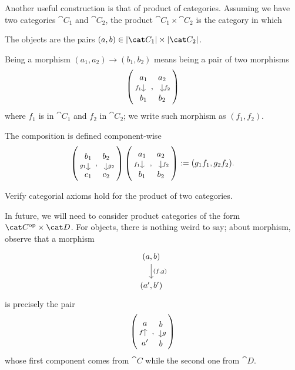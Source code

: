 Another useful construction is that of product of categories. Assuming
we have two categories \(\cat C_1\) and \(\cat C_2\), the product
\(\cat C_1 \times \cat C_2\) is the category in which
\begin{tcbitem}
\item The objects are the pairs
  \((a, b) \in \obj{\cat C_1} \times \obj{\cat C_2}\).
\item Being a morphism \((a_1, a_2) \to (b_1, b_2)\) means being a
  pair of two morphisms
  \[\left(\begin{tikzcd}[row sep=small] a_1 \ar["{f_1}", d, swap] \\
        b_1 \end{tikzcd}, \begin{tikzcd}[row sep=small] a_2
        \ar["{f_2}", d] \\ b_2 \end{tikzcd}\right)\] where \(f_1\) is
  in \(\cat C_1\) and \(f_2\) in \(\cat C_2\); we write such morphism
  as \(\left(f_1, f_2\right)\).
\item The composition is defined component-wise
  \[\left(\begin{tikzcd}[row sep=small] b_1 \ar["{g_1}", d, swap] \\
        c_1 \end{tikzcd}, \begin{tikzcd}[row sep=small] b_2
        \ar["{g_2}", d] \\ c_2 \end{tikzcd}\right)
    \left(\begin{tikzcd}[row sep=small] a_1 \ar["{f_1}", d, swap] \\
        b_1 \end{tikzcd}, \begin{tikzcd}[row sep=small] a_2
        \ar["{f_2}", d] \\ b_2 \end{tikzcd}\right) := (g_1 f_1, g_2
    f_2) .\]
\end{tcbitem}

\begin{exercise}
  Verify categorial axioms hold for the product of two categories.
\end{exercise}

In future, we will need to consider product categories of the form
\(\opcat C \times \cat D\). For objects, there is nothing weird to
say; about morphism, observe that a morphism
\[\begin{tikzcd} (a, b) \ar["{(f, g)}", d] \\ (a', b')\end{tikzcd}\]
is precisely the pair
\[\left(\begin{tikzcd}[row sep=small] a \\ a' \ar["f",
      u] \end{tikzcd}, \begin{tikzcd}[row sep=small] b \ar["g", d] \\
      b \end{tikzcd}\right)\] whose first component comes from
\(\cat C\) while the second one from \(\cat D\).

